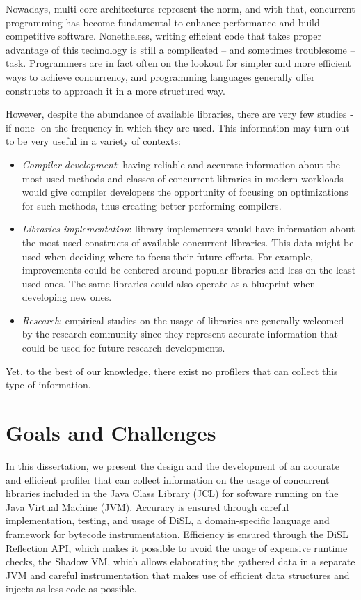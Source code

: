 \documentclass[]{usiinfthesis}
\begin{document}
Nowadays, multi-core architectures represent the norm, and with that, concurrent programming has become fundamental to enhance performance and build competitive software. Nonetheless, writing efficient code that takes proper advantage of this technology is still a complicated -- and sometimes troublesome -- task. Programmers are in fact often on the lookout for simpler and more efficient ways to achieve concurrency, and programming languages generally offer constructs to approach it in a more structured way. 

However, despite the abundance of available libraries, there are very few studies -if none- on the frequency in which they are used. This information may turn out to be very useful in a variety of contexts:

\begin{itemize}
    \item \textit{Compiler development}: having reliable and accurate information about the most used methods and classes of concurrent libraries in modern workloads would give compiler developers the opportunity of focusing on optimizations for such methods, thus creating better performing compilers. %
    \item \textit{Libraries implementation}: library implementers would have information about the most used constructs of available concurrent libraries. This data might be used when deciding where to focus their future efforts. For example, improvements could be centered around popular libraries and less on the least used ones. The same libraries could also operate as a blueprint when developing new ones.
    \item \textit{Research}: empirical studies on the usage of libraries are generally welcomed by the research community since they represent accurate information that could be used for future research developments.
\end{itemize}
Yet, to the best of our knowledge, there exist no profilers that can collect this type of information. 

\section{Goals and Challenges}
In this dissertation, we present the design and the development of an accurate and efficient profiler that can collect information on the usage of concurrent libraries included in the Java Class Library (JCL) for software running on the Java Virtual Machine (JVM). Accuracy is ensured through careful implementation, testing, and usage of DiSL, a domain-specific language and framework for bytecode instrumentation. Efficiency is ensured through the DiSL Reflection API, which makes it possible to avoid the usage of expensive runtime checks, the Shadow VM, which allows elaborating the gathered data in a separate JVM and careful instrumentation that makes use of efficient data structures and injects as less code as possible.
\end{document}
